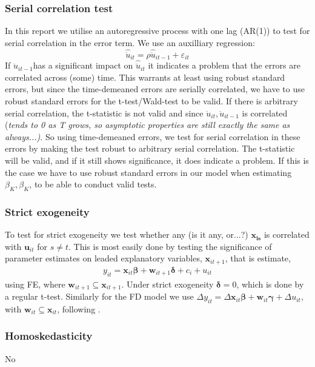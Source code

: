 \subsubsection*{Serial correlation test}
In this report we utilise an autoregressive process with one lag (AR(1)) to test for serial correlation in the error term. We use an auxilliary regression:
\begin{equation*}
    \hat{\ddot{u}}_{it}=\rho \hat{\ddot{u}}_{it-1}+\varepsilon_{it}
\end{equation*}
If $\hat{\ddot{u}}_{it-1}$has a significant impact on $\hat{\ddot{u}}_{it}$ it indicates a problem that the errors are correlated across (some) time. This warrants at least using robust standard errors, but since the time-demeaned errors are serially correlated, we have to use robust standard errors for the t-test/Wald-test to be valid. If there is arbitrary serial correlation, the t-statistic is not valid and since $\ddot{u}_{it},\ddot{u}_{it-1}$ is correlated (\textit{tends to 0 as T grows, so asymptotic properties are still exactly the same as always...)}. So using time-demeaned errors, we test for serial correlation in these errors by making the test robust to arbitrary serial correlation. The t-statistic will be valid, and if it still shows significance, it does indicate a problem. If this is the case we have to use robust standard errors in our model when estimating $\beta_K,\beta_K$, to be able to conduct valid tests.

\subsubsection*{Strict exogeneity}

To test for strict exogeneity we test whether any (is it any, or...?) $\bm{x_{is}}$ is correlated with $\bm{u}_{it}$ for $s \neq t$. This is most easily done by testing the significance of parameter estimates on leaded explanatory variables, $\bm{x}_{it+1}$, that is estimate, 
\begin{align*}
    y_{it} = \bm{x}_{it} \bm{\beta} + \bm{w}_{it+1} \bm{\delta} + c_i + u_{it}
\end{align*} 
using FE, where $\bm{w}_{it+1} \subseteq \bm{x}_{it+1}$. Under strict exogeneity $\bm{\delta} = 0$, which is done by a regular t-test. Similarly for the FD model we use $\Delta y_{it} = \Delta \bm{x}_{it} \bm{\beta} + \bm{w}_{it} \bm{\gamma} + \Delta u_{it}$, with $\bm{w}_{it} \subseteq \bm{x}_{it}$, following \cite[Chapter~10]{wooldridgeEconometricAnalysisCross2010}.

\subsubsection*{Homoskedasticity}
No
